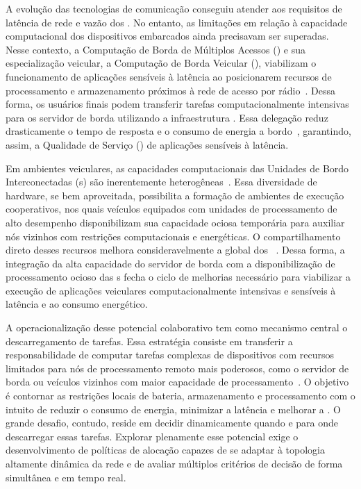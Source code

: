 A evolução das tecnologias de comunicação conseguiu atender aos requisitos de latência de rede e vazão dos . No entanto, as limitações em relação à capacidade computacional dos dispositivos embarcados ainda precisavam ser superadas. Nesse contexto, a Computação de Borda de Múltiplos Acessos () e sua especialização veicular, a Computação de Borda Veicular (), viabilizam o funcionamento de aplicações sensíveis à latência ao posicionarem recursos de processamento e armazenamento próximos à rede de acesso por rádio~\cite{mao2017,miriyala2026dl_offload_review}. Dessa forma, os usuários finais podem transferir tarefas computacionalmente intensivas para os servidor de borda utilizando a infraestrutura  . Essa delegação reduz drasticamente o tempo de resposta e o consumo de energia a bordo~\cite{liu2019,fang2021mec_iot,long2025}, garantindo, assim, a Qualidade de Serviço () de aplicações sensíveis à latência.

Em ambientes veiculares, as capacidades computacionais das Unidades de Bordo Interconectadas (s) são inerentemente heterogêneas~\cite{luo2024}. Essa diversidade de hardware, se bem aproveitada, possibilita a formação de ambientes de execução cooperativos, nos quais veículos equipados com unidades de processamento de alto desempenho disponibilizam sua capacidade ociosa temporária para auxiliar nós vizinhos com restrições computacionais e energéticas. O compartilhamento direto desses recursos melhora consideravelmente a  global dos ~\cite{he2019d2d_mec_twc}. Dessa forma, a integração da alta capacidade do servidor de borda com a disponibilização de processamento ocioso das s fecha o ciclo de melhorias necessário para viabilizar a execução de aplicações veiculares computacionalmente intensivas e sensíveis à latência e ao consumo energético.

A operacionalização desse potencial colaborativo tem como mecanismo central o descarregamento de tarefas. Essa estratégia consiste em transferir a responsabilidade de computar tarefas complexas de dispositivos com recursos limitados para nós de processamento remoto mais poderosos, como o servidor de borda ou veículos vizinhos com maior capacidade de processamento~\cite{wang2022}. O objetivo é contornar as restrições locais de bateria, armazenamento e processamento com o intuito de reduzir o consumo de energia, minimizar a latência e melhorar a . O grande desafio, contudo, reside em decidir dinamicamente quando e para onde descarregar essas tarefas. Explorar plenamente esse potencial exige o desenvolvimento de políticas de alocação capazes de se adaptar à topologia altamente dinâmica da rede e de avaliar múltiplos critérios de decisão de forma simultânea e em tempo real.

